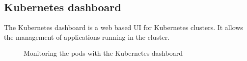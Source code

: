 \begin{appendices}
    \section{Kubernetes dashboard}
    The Kubernetes dashboard is a web based UI for Kubernetes clusters.
    It allows the management of applications running in the cluster.
    \begin{figure}[H]
        \centering
        \caption{Monitoring the pods with the Kubernetes dashboard}
        \label{fig:kubernetes-dashboard-monitoring}
    \end{figure}
    \newpage
\end{appendices}
